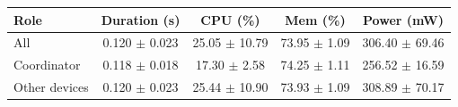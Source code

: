 \begin{tabular}{lcccc}
\hline
\textbf{Role} & \textbf{Duration (s)} & \textbf{CPU (\%)} & \textbf{Mem (\%)} & \textbf{Power (mW)} \\
\hline
All & 0.120 $\pm$ 0.023 & 25.05 $\pm$ 10.79 & 73.95 $\pm$ 1.09 & 306.40 $\pm$ 69.46 \\
Coordinator & 0.118 $\pm$ 0.018 & 17.30 $\pm$ 2.58 & 74.25 $\pm$ 1.11 & 256.52 $\pm$ 16.59 \\
Other devices & 0.120 $\pm$ 0.023 & 25.44 $\pm$ 10.90 & 73.93 $\pm$ 1.09 & 308.89 $\pm$ 70.17 \\
\hline
\end{tabular}
